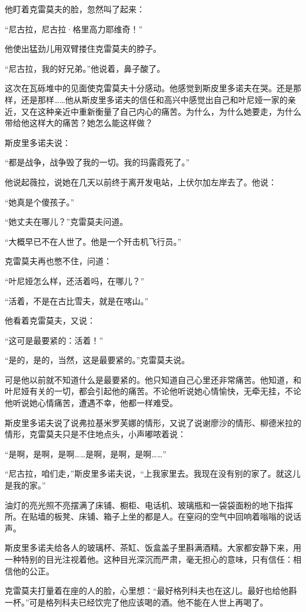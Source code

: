 他盯着克雷莫夫的脸，忽然叫了起来：

“尼古拉，尼古拉·格里高力耶维奇！”

他使出猛劲儿用双臂搂住克雷莫夫的脖子。

“尼古拉，我的好兄弟。”他说着，鼻子酸了。

这次在瓦砾堆中的见面使克雷莫夫十分感动。他感觉到斯皮里多诺夫在哭。还是那样，还是那样……他从斯皮里多诺夫的信任和高兴中感觉出自己和叶尼娅一家的亲近，又在这种亲近中重新衡量了自己内心的痛苦。为什么，为什么她要走，为什么带给他这样大的痛苦？她怎么能这样做？

斯皮里多诺夫说：

“都是战争，战争毁了我的一切。我的玛露霞死了。”

他说起薇拉，说她在几天以前终于离开发电站，上伏尔加左岸去了。他说：

“她真是个傻孩子。”

“她丈夫在哪儿？”克雷莫夫问道。

“大概早已不在人世了。他是一个歼击机飞行员。”

克雷莫夫再也憋不住，问道：

“叶尼娅怎么样，还活着吗，在哪儿？”

“活着，不是在古比雪夫，就是在喀山。”

他看着克雷莫夫，又说：

“这可是最要紧的：活着！”

“是的，是的，当然，这是最要紧的。”克雷莫夫说。

可是他以前就不知道什么是最要紧的。他只知道自己心里还非常痛苦。他知道，和叶尼娅有关的一切，都会引起他的痛苦。不论他听说她心情愉快，无牵无挂，不论他听说她心情痛苦，遭遇不幸，他都一样难受。

斯皮里多诺夫说了说弗拉基米罗芙娜的情形，又说了说谢廖沙的情形、柳德米拉的情形，克雷莫夫只是不住地点头，小声嘟哝着说：

“是啊，是啊，是啊……是啊，是啊，是啊……”

“尼古拉，咱们走，”斯皮里多诺夫说，“上我家里去。我现在没有别的家了。就这儿是我的家。”

油灯的亮光照不亮摆满了床铺、橱柜、电话机、玻璃瓶和一袋袋面粉的地下指挥所。在贴墙的板凳、床铺、箱子上坐的都是人。在窒闷的空气中回响着嗡嗡的说话声。

斯皮里多诺夫给各人的玻璃杯、茶缸、饭盒盖子里斟满酒精。大家都安静下来，用一种特别的目光注视着他。这种目光深沉而严肃，毫无担心的意味，只有信任：相信他的公正。

克雷莫夫打量着在座的人的脸，心里想：“最好格列科夫也在这儿。最好也给他斟一杯。”可是格列科夫已经饮完了他应该喝的酒。他不能在人世上再喝了。

